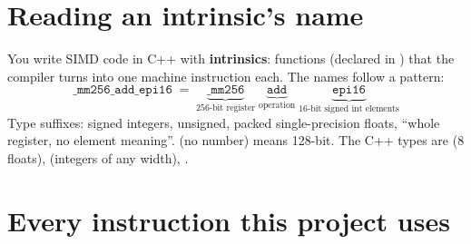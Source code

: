 \section{Reading an intrinsic's name}

You write SIMD code in C++ with \textbf{intrinsics}: functions (declared in ) that the compiler turns into one machine instruction each. The names follow a pattern:
\[
\texttt{\_mm256\_add\_epi16}\;=\;\underbrace{\texttt{\_mm256}}_{\text{256-bit register}}\;\underbrace{\texttt{add}}_{\text{operation}}\;\underbrace{\texttt{epi16}}_{\text{16-bit signed int elements}}
\]
Type suffixes:  signed integers,  unsigned,  packed single-precision floats,  ``whole register, no element meaning''.  (no number) means 128-bit. The C++ types are  (8 floats),  (integers of any width), .

\section{Every instruction this project uses}

